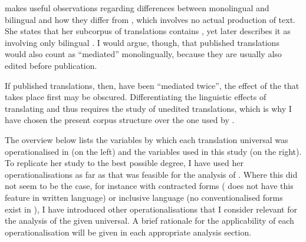 \documentclass[output=paper]{LSP/langsci}
\begin{document}
\textcite{kruger12} makes useful observations regarding differences between monolingual and bilingual  and how they differ from , which involves no actual production of text. She states that her subcorpus of translations contains , yet later describes it as involving only bilingual  \parencite*[see Table 7 in][380]{kruger12}. I would argue, though, that published translations would also count as \enquote{mediated} monolingually, because they are usually also edited before publication.

If published translations, then, have been \enquote{mediated twice}, the effect of the  that takes place first may be obscured. Differentiating the linguistic effects of translating and  thus requires the study of unedited translations, which is why I have chosen the present corpus structure over the one used by \textcite{kruger12}.

The overview below lists the variables by which each translation universal was operationalised in \textcite[362]{kruger12} (on the left) and the variables used in this study (on the right). To replicate her study to the best possible degree, I have used her operationalisations as far as that was feasible for the analysis of . Where this did not seem to be the case, for instance with contracted forms ( does not have this feature in written language) or inclusive language (no conventionalised forms exist in ), I have introduced other operationalisations that I consider relevant for the analysis of the given universal. A brief rationale for the applicability of each operationalisation will be given in each appropriate analysis section.
\end{document}
